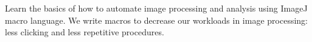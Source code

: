 
Learn the basics of how to automate image processing and analysis using ImageJ macro language. We write macros to decrease our workloads in image processing: less clicking and less repetitive procedures. 